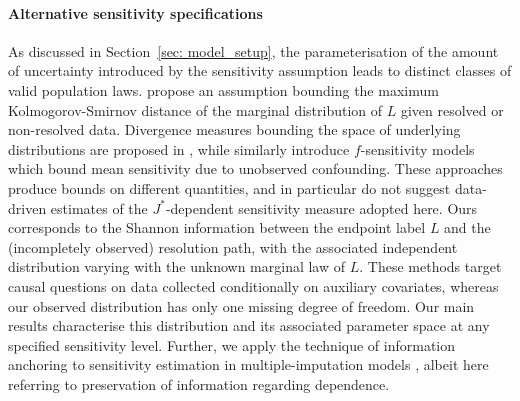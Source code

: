 \paragraph{Alternative sensitivity specifications} 
As discussed in Section~\ref{sec: model_setup}, the parameterisation of the amount of uncertainty introduced by the sensitivity assumption leads to distinct classes of valid population laws. \citet{kline2013} propose an assumption bounding the maximum Kolmogorov-Smirnov distance of the marginal distribution of $L$ given resolved or non-resolved data. Divergence measures bounding the space of underlying distributions are proposed in \citep{christensen2023}, while \citet{jin2026} similarly introduce $f$-sensitivity models which bound mean sensitivity due to unobserved confounding. These approaches produce bounds on different quantities, and in particular do not suggest data-driven estimates of the $J^*$-dependent sensitivity measure adopted here. Ours corresponds to the Shannon information between the endpoint label $L$ and the (incompletely observed) resolution path, with the associated independent distribution varying with the unknown marginal law of $L$. These methods target causal questions on data collected conditionally on auxiliary covariates, whereas our observed distribution has only one missing degree of freedom. Our main results characterise this distribution and its associated parameter space at any specified sensitivity level. Further, we apply the technique of information anchoring to sensitivity estimation in multiple-imputation models \citep{cro2019}, albeit here referring to preservation of information regarding dependence.

